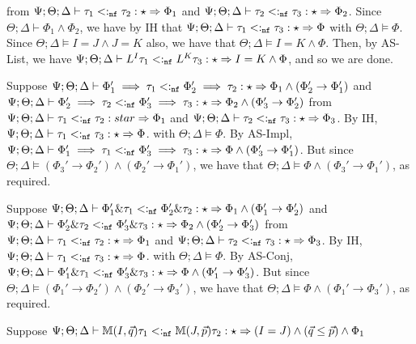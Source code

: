   from $\Psi ; \Theta ; \Delta \vdash \tau_1 <:_{\texttt{nf}} \tau_2 : \star \Rightarrow \Phi_1$ and
  $\Psi ; \Theta ; \Delta \vdash \tau_2 <:_{\texttt{nf}} \tau_3 : \star \Rightarrow \Phi_2$. Since $\Theta ; \Delta \vdash \Phi_1 \wedge \Phi_2$, we have by IH that
  $\Psi ; \Theta ; \Delta \vdash \tau_1 <:_{\texttt{nf}} \tau_3 : \star \Rightarrow \Phi$ with $\Theta ; \Delta \vDash \Phi$. Since $\Theta ; \Delta \vDash I = J \wedge J = K$ also,
  we have that $\Theta ; \Delta \vDash I = K \wedge \Phi$. Then, by AS-List, we have
  $\Psi ; \Theta ; \Delta \vdash L^I \tau_1 <:_{\texttt{nf}} L^K \tau_3 : \star \Rightarrow I = K \wedge \Phi$, and so we are done.
  \item[(AS-Impl)] Suppose $\Psi ; \Theta ; \Delta \vdash \Phi_1' \implies \tau_1 <:_{\texttt{nf}} \Phi_2' \implies \tau_2 : \star \Rightarrow \Phi_1 \wedge (\Phi_2' \to \Phi_1')$
  and $\Psi ; \Theta ; \Delta \vdash \Phi_2' \implies \tau_2 <:_{\texttt{nf}} \Phi_3' \implies \tau_3 : \star \Rightarrow \Phi_2 \wedge (\Phi_3' \to \Phi_2')$
  from $\Psi ; \Theta ; \Delta \vdash \tau_1 <:_{\texttt{nf}} \tau_2 : star \Rightarrow \Phi_1$ and 
  $\Psi ; \Theta ; \Delta \vdash \tau_2 <:_{\texttt{nf}} \tau_3 : \star \Rightarrow \Phi_3$. By IH,
  $\Psi ; \Theta ; \Delta \vdash \tau_1 <:_{\texttt{nf}} \tau_3 : \star \Rightarrow \Phi$. with $\Theta ; \Delta \vDash \Phi$.
  By AS-Impl, $\Psi ; \Theta ; \Delta \vdash \Phi_1' \implies \tau_1 <:_{\texttt{nf}} \Phi_3' \implies \tau_3 : \star \Rightarrow \Phi \wedge (\Phi_3' \to \Phi_1')$. But since $\Theta ; \Delta \vDash (\Phi_3' \to \Phi_2') \wedge (\Phi_2' \to \Phi_1')$, we have that $\Theta ; \Delta \vDash \Phi \wedge (\Phi_3' \to \Phi_1')$, as required.
  \item[(AS-Conj)] Suppose $\Psi ; \Theta ; \Delta \vdash \Phi_1' \& \tau_1 <:_{\texttt{nf}} \Phi_2' \& \tau_2 : \star \Rightarrow \Phi_1 \wedge (\Phi_1' \to \Phi_2')$
  and $\Psi ; \Theta ; \Delta \vdash \Phi_2' \& \tau_2 <:_{\texttt{nf}} \Phi_3' \& \tau_3 : \star \Rightarrow \Phi_2 \wedge (\Phi_2' \to \Phi_3')$
  from $\Psi ; \Theta ; \Delta \vdash \tau_1 <:_{\texttt{nf}} \tau_2 : \star \Rightarrow \Phi_1$ and 
  $\Psi ; \Theta ; \Delta \vdash \tau_2 <:_{\texttt{nf}} \tau_3 : \star \Rightarrow \Phi_3$. By IH,
  $\Psi ; \Theta ; \Delta \vdash \tau_1 <:_{\texttt{nf}} \tau_3 : \star \Rightarrow \Phi$. with $\Theta ; \Delta \vDash \Phi$.
  By AS-Conj, $\Psi ; \Theta ; \Delta \vdash \Phi_1' \& \tau_1 <:_{\texttt{nf}} \Phi_3' \& \tau_3 : \star \Rightarrow \Phi \wedge (\Phi_1' \to \Phi_3')$. But since $\Theta ; \Delta \vDash (\Phi_1' \to \Phi_2') \wedge (\Phi_2' \to \Phi_3')$, we have that $\Theta ; \Delta \vDash \Phi \wedge (\Phi_1' \to \Phi_3')$, as required.
  \item[(AS-Monad)]
  Suppose $\Psi ; \Theta ; \Delta \vdash \mathbb{M}(I,\vec{q}) \tau_1 <:_{\texttt{nf}} \mathbb{M}(J,\vec{p}) \tau_2 : \star \Rightarrow (I = J) \wedge (\vec{q} \leq \vec{p}) \wedge \Phi_1$
